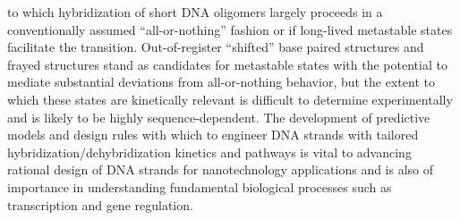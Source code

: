 \documentclass[journal=jpcbfk,manuscript=article]{achemso}
\begin{document}
to which hybridization of short DNA oligomers largely proceeds in a conventionally assumed ``all-or-nothing'' fashion or if long-lived metastable states facilitate the transition.\citep{Araque2016LatticeCooperativity, Sikora2013ModelingIntermediates, Wyer2014KineticsAT-tracts, Sanstead2016, Sanstead2018DirectDehybridization, Xiao2019} Out-of-register ``shifted'' base paired structures \citep{Hinckley2014Coarse-grainedEffects, Maciejczyk2014DNAModel, Araque2016LatticeCooperativity, Xiao2019} and frayed structures \citep{Zgarbova2014BaseRNA, Nonin1995TerminalFraying, Nikolova2012ProbingSimulations, Andreatta2006UltrafastHelix} stand as candidates for metastable states with the potential to mediate substantial deviations from all-or-nothing behavior, but the extent to which these states are kinetically relevant is difficult to determine experimentally and is likely to be highly sequence-dependent. The development of predictive models and design rules with which to engineer DNA strands with tailored hybridization/dehybridization kinetics and pathways is vital to advancing rational design of DNA strands for nanotechnology applications and is also of importance in understanding fundamental biological processes such as transcription and gene regulation.
\end{document}
